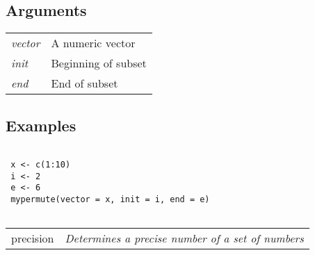 \documentclass[12pt,letterpaper]{article}
\begin{document}
\subsection*{Arguments}

\begin{table}[!ht]
\begin{center}
\begin{tabularx}{\textwidth}{X X}
\hspace{0.5cm} \textit{vector} & A numeric vector\\
\hspace{0.5cm} \textit{init} & Beginning of subset\\
\hspace{0.5cm} \textit{end} & End of subset\\
\end{tabularx}
\end{center}
\end{table} 

\subsection*{Examples}

\begin{lstlisting}

 x <- c(1:10)
 i <- 2
 e <- 6
 mypermute(vector = x, init = i, end = e)
   
\end{lstlisting}

\vspace{0.5cm}


\hrulefill   

\begin{table}[!ht]
\begin{center}
\begin{tabularx}{\textwidth}{ X X}
\hspace{0.5cm} precision & \textit{Determines a precise number of a set of numbers}\\
\end{tabularx}
\end{center}
\end{table} 

\vspace{-0.5cm}

\hrulefill  

\vspace{0.5cm}
\end{document}

